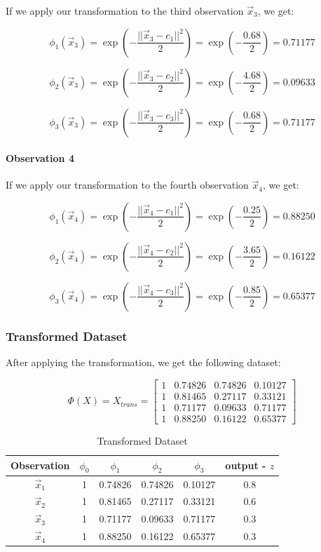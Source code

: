 \documentclass{article}
\begin{document}
If we apply our transformation to the third observation $\vec{x}_3$, we get:

\[ \phi_1(\vec{x}_3) = \exp \left( - \frac{||\vec{x}_3 - c_1||^2}{2} \right) = \exp \left( - \frac{0.68}{2} \right) = 0.71177 \]

\[ \phi_2(\vec{x}_3) = \exp \left( - \frac{||\vec{x}_3 - c_2||^2}{2} \right) = \exp \left( - \frac{4.68}{2} \right) = 0.09633 \]

\[ \phi_3(\vec{x}_3) = \exp \left( - \frac{||\vec{x}_3 - c_3||^2}{2} \right) = \exp \left( - \frac{0.68}{2} \right) = 0.71177 \]

\paragraph{Observation 4}

If we apply our transformation to the fourth observation $\vec{x}_4$, we get:

\[ \phi_1(\vec{x}_4) = \exp \left( - \frac{||\vec{x}_4 - c_1||^2}{2} \right) = \exp \left( - \frac{0.25}{2} \right) = 0.88250 \]

\[ \phi_2(\vec{x}_4) = \exp \left( - \frac{||\vec{x}_4 - c_2||^2}{2} \right) = \exp \left( - \frac{3.65}{2} \right) = 0.16122 \]

\[ \phi_3(\vec{x}_4) = \exp \left( - \frac{||\vec{x}_4 - c_3||^2}{2} \right) = \exp \left( - \frac{0.85}{2} \right) = 0.65377 \]

\subsubsection*{Transformed Dataset}

After applying the transformation, we get the following dataset:

\[ \Phi(X) = X_{trans} = \begin{bmatrix}
    1 & 0.74826 & 0.74826 & 0.10127 \\
    1 & 0.81465 & 0.27117 & 0.33121 \\
    1 & 0.71177 & 0.09633 & 0.71177 \\
    1 & 0.88250 & 0.16122 & 0.65377
\end{bmatrix} \]

\begin{table}[H]
    \centering
    \begin{tabular}{|c|c|c|c|c|c|}
        \hline
        Observation     & $\phi_0$ & $\phi_1$ & $\phi_2$ & $\phi_3$ & output - $z$ \\ \hline
        $\vec{x}_1$               & 1     & 0.74826   & 0.74826  & 0.10127 & 0.8           \\ \hline
        $\vec{x}_2$               & 1     & 0.81465   & 0.27117   & 0.33121  & 0.6           \\ \hline
        $\vec{x}_3$               & 1     & 0.71177  & 0.09633   & 0.71177   & 0.3           \\ \hline
        $\vec{x}_4$               & 1     & 0.88250  & 0.16122   & 0.65377   & 0.3           \\ \hline
    \end{tabular}
    \caption{Transformed Dataset}
    \label{tab:my_label}
\end{table}
\end{document}
